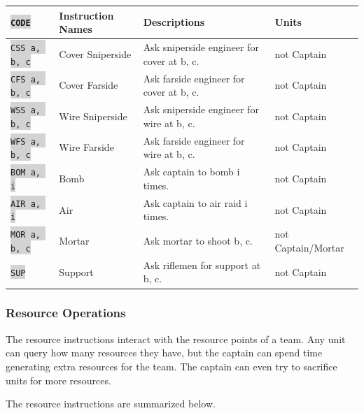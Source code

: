 \documentclass{article}
\newcommand{\vnscode}[1]{\colorbox{lightgray}{\lstinline[language=vns]{#1}}}
\begin{document}
\begin{minipage}{\textwidth}
\label{table:request}
\centering
\begin{tabular}{llll}
    \hline \vnscode{CODE} & Instruction Names & Descriptions & Units \\ \hline
    \vnscode{CSS a, b, c} & Cover Sniperside & Ask sniperside engineer for cover at b, c. & not Captain \\
    \vnscode{CFS a, b, c} & Cover Farside & Ask farside engineer for cover at b, c. & not Captain \\
    \vnscode{WSS a, b, c} & Wire Sniperside & Ask sniperside engineer for wire at b, c. & not Captain \\
    \vnscode{WFS a, b, c} & Wire Farside & Ask farside engineer for wire at b, c. & not Captain \\
    \vnscode{BOM a, i} & Bomb & Ask captain to bomb i times. & not Captain \\
    \vnscode{AIR a, i} & Air & Ask captain to air raid i times. & not Captain \\
    \vnscode{MOR a, b, c} & Mortar & Ask mortar to shoot b, c. & not Captain/Mortar \\
    \vnscode{SUP} & Support & Ask riflemen for support at b, c. & not Captain \\
\end{tabular}
\end{minipage}

\subsubsection{Resource Operations} %

The resource instructions interact with the resource points of a team. Any unit
can query how many resources they have, but the captain can spend time
generating extra resources for the team. The captain can even try to sacrifice
units for more resources.

The resource instructions are summarized below.
\end{document}
